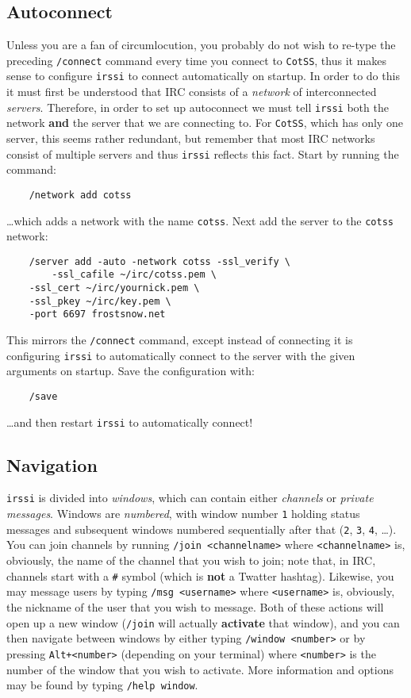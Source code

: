 \documentclass{article}
\begin{document}
{\subsection{Autoconnect}
Unless you are a fan of circumlocution, you probably do not wish to re-type the preceding \texttt{/connect} command every time you connect to \texttt{CotSS}, thus it makes sense to configure \texttt{irssi} to connect automatically on startup.  In order to do this it must first be understood that IRC consists of a \textit{network} of interconnected \textit{servers}.  Therefore, in order to set up autoconnect we must tell \texttt{irssi} both the network \textbf{and} the server that we are connecting to.  For \texttt{CotSS}, which has only one server, this seems rather redundant, but remember that most IRC networks consist of multiple servers and thus \texttt{irssi} reflects this fact.  Start by running the command:
\begin{lstlisting}
    /network add cotss
\end{lstlisting}
\ldots which adds a network with the name \texttt{cotss}.  Next add the server to the \texttt{cotss} network:
\begin{lstlisting}
    /server add -auto -network cotss -ssl_verify \
        -ssl_cafile ~/irc/cotss.pem \
	-ssl_cert ~/irc/yournick.pem \
	-ssl_pkey ~/irc/key.pem \
	-port 6697 frostsnow.net
\end{lstlisting}
This mirrors the \texttt{/connect} command, except instead of connecting it is configuring \texttt{irssi} to automatically connect to the server with the given arguments on startup.  Save the configuration with:
\begin{lstlisting}
    /save
\end{lstlisting}
\ldots and then restart \texttt{irssi} to automatically connect!

\subsection{Navigation}
\texttt{irssi} is divided into \textit{windows}, which can contain either \textit{channels} or \textit{private messages}.  Windows are \textit{numbered}, with window number \texttt{1} holding status messages and subsequent windows numbered sequentially after that (\texttt{2}, \texttt{3}, \texttt{4}, \ldots).  You can join channels by running \texttt{/join <channelname>} where \texttt{<channelname>} is, obviously, the name of the channel that you wish to join; note that, in IRC, channels start with a \texttt{\#} symbol (which is \textbf{not} a Twatter hashtag).  Likewise, you may message users by typing \texttt{/msg <username>} where \texttt{<username>} is, obviously, the nickname of the user that you wish to message.  Both of these actions will open up a new window (\texttt{/join} will actually \textbf{activate} that window), and you can then navigate between windows by either typing \texttt{/window <number>} or by pressing \texttt{Alt+<number>} (depending on your terminal) where \texttt{<number>} is the number of the window that you wish to activate.  More information and options may be found by typing \texttt{/help window}.

}
\end{document}
